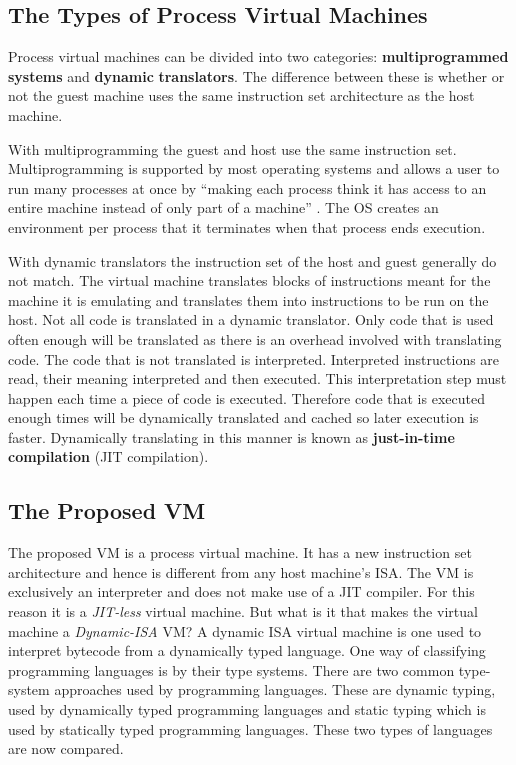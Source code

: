 \documentclass[english,a4paper,12pt]{report}
\begin{document}
\subsection{The Types of Process Virtual Machines}

Process virtual machines can be divided into two categories:
\textbf{multiprogrammed systems} and \textbf{dynamic}
\textbf{translators}. The difference between these is whether or not
the guest machine uses the same instruction set architecture as the
host machine.

With multiprogramming the guest and host use the same instruction
set. Multiprogramming is supported by most operating systems and
allows a user to run many processes at once by ``making each process
think it has access to an entire machine instead of only part of a
machine'' \cite[pg13]{JamesE.Smith2005}. The OS creates an environment
per process that it terminates when that process ends execution.

With dynamic translators the instruction set of the host and guest
generally do not match. The virtual machine translates blocks of
instructions meant for the machine it is emulating and translates them
into instructions to be run on the host. Not all code is translated in
a dynamic translator. Only code that is used often enough will be
translated as there is an overhead involved with translating code. The
code that is not translated is interpreted. Interpreted instructions
are read, their meaning interpreted and then executed. This
interpretation step must happen each time a piece of code is executed.
Therefore code that is executed enough times will be dynamically
translated and cached so later execution is faster. Dynamically
translating in this manner is known as \textbf{just-in-time
  compilation} (JIT compilation).

\subsection{The Proposed VM}
The proposed VM is a process virtual machine. It has a new instruction set
architecture and hence is different from any host machine's ISA. The
VM is exclusively an interpreter and does not make use of a JIT
compiler. For this reason it is a \emph{JIT-less} virtual machine. But
what is it that makes the virtual machine a \emph{Dynamic-ISA} VM? A
dynamic ISA virtual machine is one used to interpret bytecode from a
dynamically typed language. One way of classifying programming
languages is by their type systems. There are two common type-system
approaches used by programming languages. These are dynamic typing,
used by dynamically typed programming languages and static typing
which is used by statically typed programming languages. These two
types of languages are now compared.
\end{document}
